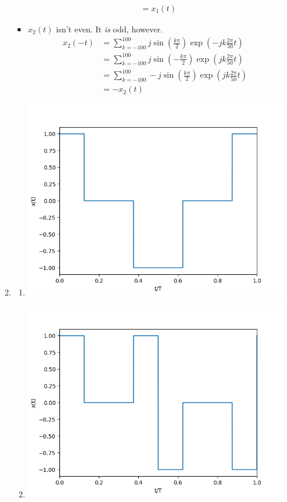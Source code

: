 \documentclass[12pt]{article}
\begin{document}
\begin{enumerate}
\begin{enumerate}
\begin{itemize}
\begin{align*}
                                           & = x_1(t)
                                    \end{align*}
                              \item $x_2(t)$ isn't even. It \textit{is} odd, however.
                                    \begin{align*}
                                          x_2(-t)
                                           & = \sum_{k=-100}^{100} j\sin\left(\frac{k\pi}{2}\right)\exp\left(-jk\frac{2\pi}{50}t\right) \\
                                           & = \sum_{k=-100}^{100} j\sin\left(-\frac{k\pi}{2}\right)\exp\left(jk\frac{2\pi}{50}t\right) \\
                                           & = \sum_{k=-100}^{100} -j\sin\left(\frac{k\pi}{2}\right)\exp\left(jk\frac{2\pi}{50}t\right) \\
                                           & = -x_2(t)
                                    \end{align*}
                        \end{itemize}
                  \item \begin{enumerate}
                              \item \includegraphics[width=12cm]{img/hw4/even}
                              \item \includegraphics[width=12cm]{img/hw4/odd}

\end{enumerate}
\end{enumerate}
\end{enumerate}
\end{document}

